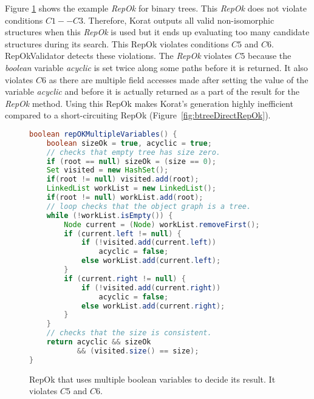 Figure \ref{fig:repOkMultipleBooleanVariables} shows the example
\emph{RepOk} for binary trees.  This \emph{RepOk} does not violate
conditions $C1--C3$.  Therefore, Korat outputs all valid
non-isomorphic structures when this \emph{RepOk} is used but it ends
up evaluating too many candidate structures during its search.  This
RepOk violates conditions $C5$ and $C6$.  RepOkValidator detects these
violations.  The \emph{RepOk} violates $C5$ because the \emph{boolean}
variable \emph{acyclic} is set twice along some paths before it is
returned.  It also violates $C6$ as there are multiple field accesses
made after setting the value of the variable \emph{acyclic} and before
it is actually returned as a part of the result for the \emph{RepOk}
method.  Using this RepOk makes Korat's generation highly inefficient
compared to a short-circuiting RepOk
(Figure~\ref{fig:btreeDirectRepOk}).


\begin{figure}
\centering
\begin{lstlisting}[language=Java]
boolean repOKMultipleVariables() {
    boolean sizeOk = true, acyclic = true;
    // checks that empty tree has size zero.
    if (root == null) sizeOk = (size == 0);
    Set visited = new HashSet();
    if(root != null) visited.add(root);
    LinkedList workList = new LinkedList();
    if(root != null) workList.add(root);
    // loop checks that the object graph is a tree.
    while (!workList.isEmpty()) {
        Node current = (Node) workList.removeFirst();
        if (current.left != null) {
            if (!visited.add(current.left)) 
                acyclic = false;
            else workList.add(current.left);
        }
        if (current.right != null) {
            if (!visited.add(current.right)) 
                acyclic = false;
            else workList.add(current.right);
        }
    }
    // checks that the size is consistent.
    return acyclic && sizeOk 
           && (visited.size() == size);  
}
\end{lstlisting}
\caption{RepOk that uses multiple boolean variables to decide its result. It violates $C5$ and $C6$.}
\label{fig:repOkMultipleBooleanVariables}
\end{figure}

